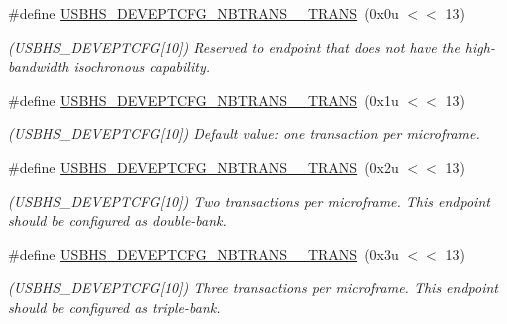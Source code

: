 \begin{DoxyCompactItemize}
\#define \mbox{\hyperlink{group__SAMV71__USBHS_ga43b2db530b01ee6470bfc7054287b538}{U\+S\+B\+H\+S\+\_\+\+D\+E\+V\+E\+P\+T\+C\+F\+G\+\_\+\+N\+B\+T\+R\+A\+N\+S\+\_\+\_\+\+T\+R\+A\+NS}}~(0x0u $<$$<$ 13)
\begin{DoxyCompactList}\small\item\em (U\+S\+B\+H\+S\+\_\+\+D\+E\+V\+E\+P\+T\+C\+FG\mbox{[}10\mbox{]}) Reserved to endpoint that does not have the high-\/bandwidth isochronous capability. \end{DoxyCompactList}\item 
\mbox{\label{group__SAMV71__USBHS_ga6db69fd65f655a87942c2302b78e888c}} 
\#define \mbox{\hyperlink{group__SAMV71__USBHS_ga6db69fd65f655a87942c2302b78e888c}{U\+S\+B\+H\+S\+\_\+\+D\+E\+V\+E\+P\+T\+C\+F\+G\+\_\+\+N\+B\+T\+R\+A\+N\+S\+\_\+\_\+\+T\+R\+A\+NS}}~(0x1u $<$$<$ 13)
\begin{DoxyCompactList}\small\item\em (U\+S\+B\+H\+S\+\_\+\+D\+E\+V\+E\+P\+T\+C\+FG\mbox{[}10\mbox{]}) Default value\+: one transaction per microframe. \end{DoxyCompactList}\item 
\mbox{\label{group__SAMV71__USBHS_ga344108e9f3093a59992c4b40dcf55d85}} 
\#define \mbox{\hyperlink{group__SAMV71__USBHS_ga344108e9f3093a59992c4b40dcf55d85}{U\+S\+B\+H\+S\+\_\+\+D\+E\+V\+E\+P\+T\+C\+F\+G\+\_\+\+N\+B\+T\+R\+A\+N\+S\+\_\+\_\+\+T\+R\+A\+NS}}~(0x2u $<$$<$ 13)
\begin{DoxyCompactList}\small\item\em (U\+S\+B\+H\+S\+\_\+\+D\+E\+V\+E\+P\+T\+C\+FG\mbox{[}10\mbox{]}) Two transactions per microframe. This endpoint should be configured as double-\/bank. \end{DoxyCompactList}\item 
\mbox{\label{group__SAMV71__USBHS_ga668cdeba374eaa8796bc36556b33d305}} 
\#define \mbox{\hyperlink{group__SAMV71__USBHS_ga668cdeba374eaa8796bc36556b33d305}{U\+S\+B\+H\+S\+\_\+\+D\+E\+V\+E\+P\+T\+C\+F\+G\+\_\+\+N\+B\+T\+R\+A\+N\+S\+\_\+\_\+\+T\+R\+A\+NS}}~(0x3u $<$$<$ 13)
\begin{DoxyCompactList}\small\item\em (U\+S\+B\+H\+S\+\_\+\+D\+E\+V\+E\+P\+T\+C\+FG\mbox{[}10\mbox{]}) Three transactions per microframe. This endpoint should be configured as triple-\/bank. \end{DoxyCompactList}\item 

\end{DoxyCompactItemize}
